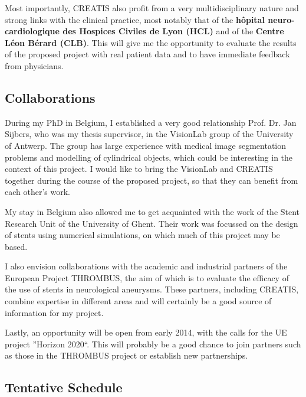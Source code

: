 \documentclass[a4paper]{article}
\begin{document}
Most importantly, CREATIS also profit from a very multidisciplinary nature and strong links with the clinical practice, most notably that of the {\bf h\^opital neuro-cardiologique des Hospices Civiles de Lyon (HCL)} and of the {\bf Centre L\'eon B\'erard (CLB)}. This will give me the opportunity to evaluate the results of the proposed project with real patient data and to have immediate feedback from physicians. 

\subsection{Collaborations}

During my PhD in Belgium, I established a very good relationship Prof. Dr. Jan Sijbers, who was my thesis supervisor, in the VisionLab group of the University of Antwerp. The group has large experience with medical image segmentation problems and modelling of cylindrical objects, which could be interesting in the context of this project. I would like to bring the VisionLab and CREATIS together during the course of the proposed project, so that they can benefit from each other's work.

My stay in Belgium also allowed me to get acquainted with the work of the Stent Research Unit of the University of Ghent. Their work was focussed on the design of stents using numerical simulations, on which much of this project may be based. 

I also envision collaborations with the academic and industrial partners of the European Project THROMBUS, the aim of which is to evaluate the efficacy of the use of stents in neurological aneurysms. These partners, including CREATIS, combine expertise in different areas and will certainly be a good source of information for my project.

Lastly, an opportunity will be open from early 2014, with the calls for the UE project ''Horizon 2020``. This will probably be a good chance to join partners such as those in the THROMBUS project or establish new partnerships. 

\subsection{Tentative Schedule}
\end{document}
